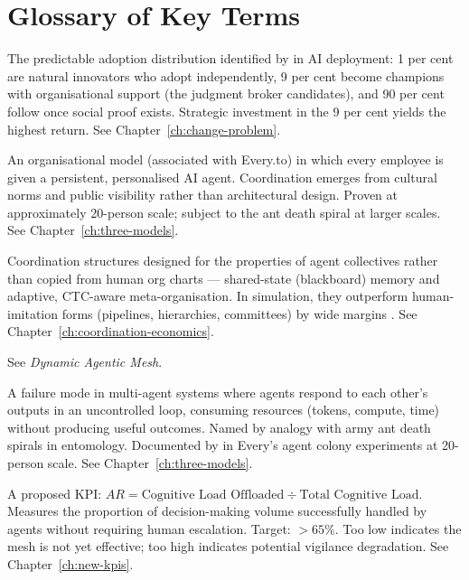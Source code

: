 \chapter{Glossary of Key Terms}
\label{ch:glossary}

\begin{description}[style=nextline, leftmargin=2em, font=\bfseries\color{navyblue}]

\item[1-9-90 Pattern]
The predictable adoption distribution identified by \textcite{BCGAgenticShift2025} in AI deployment: 1 per cent are natural innovators who adopt independently, 9 per cent become champions with organisational support (the judgment broker candidates), and 90 per cent follow once social proof exists. Strategic investment in the 9 per cent yields the highest return. See Chapter~\ref{ch:change-problem}.

\item[Agent Colony]
An organisational model (associated with Every.to) in which every employee is given a persistent, personalised AI agent. Coordination emerges from cultural norms and public visibility rather than architectural design. Proven at approximately 20-person scale; subject to the ant death spiral at larger scales. See Chapter~\ref{ch:three-models}.

\item[Agent-Native Organisation Forms]
Coordination structures designed for the properties of agent collectives rather than copied from human org charts --- shared-state (blackboard) memory and adaptive, CTC-aware meta-organisation. In simulation, they outperform human-imitation forms (pipelines, hierarchies, committees) by wide margins \parencite{Liu2026}. See Chapter~\ref{ch:coordination-economics}.

\item[Agentic Mesh]
See \emph{Dynamic Agentic Mesh}.

\item[Ant Death Spiral]
A failure mode in multi-agent systems where agents respond to each other's outputs in an uncontrolled loop, consuming resources (tokens, compute, time) without producing useful outcomes. Named by analogy with army ant death spirals in entomology. Documented by \textcite{Shipper2026} in Every's agent colony experiments at 20-person scale. See Chapter~\ref{ch:three-models}.

\item[Augmentation Ratio (AR)]
A proposed KPI: $AR = \text{Cognitive Load Offloaded} \div \text{Total Cognitive Load}$. Measures the proportion of decision-making volume successfully handled by agents without requiring human escalation. Target: $>65\%$. Too low indicates the mesh is not yet effective; too high indicates potential vigilance degradation. See Chapter~\ref{ch:new-kpis}.


\end{description}
